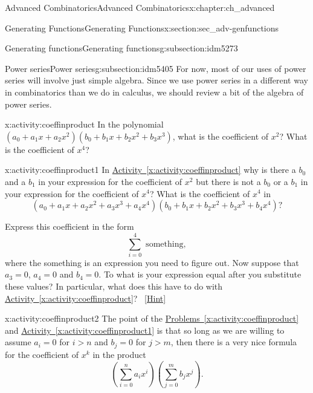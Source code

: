 \documentclass[oneside,10pt,]{book}
\numberwithin{equation}{chapter}
\begin{document}
\begin{chapterptx}{Advanced Combinatorics}{}{Advanced Combinatorics}{}{}{x:chapter:ch_advanced}
\begin{sectionptx}{Generating Functions}{}{Generating Functions}{}{}{x:section:sec_adv-genfunctions}
\begin{subsectionptx}{Generating functions}{}{Generating functions}{}{}{g:subsection:idm5273}
\end{subsectionptx}
%
%
\typeout{************************************************}
\typeout{************************************************}
%
\begin{subsectionptx}{Power series}{}{Power series}{}{}{g:subsection:idm5405}
For now, most of our uses of power series will involve just simple algebra. Since we use power series in a different way in combinatorics than we do in calculus, we should review a bit of the algebra of power series.%
\begin{activity}{}{x:activity:coeffinproduct}%
In the polynomial \((a_0 +a_1x+a_2x^2)(b_0+b_1x+b_2x^2+b_3x^3)\), what is the coefficient of \(x^2\)? What is the coefficient of \(x^4\)?%
\end{activity}
\begin{activity}{}{x:activity:coeffinproduct1}%
In \hyperref[x:activity:coeffinproduct]{Activity~\ref{x:activity:coeffinproduct}} why is there a \(b_0\) and a \(b_1\) in your expression for the coefficient of \(x^2\) but there is not a \(b_0\) or a \(b_1\) in your expression for the coefficient of \(x^4\)? What is the coefficient of \(x^4\) in%
\begin{equation*}
(a_0+a_1x+a_2x^2+a_3x^3+a_4x^4)(b_0+b_1x+b_2x^2
+b_3x^3+b_4x^4)?
\end{equation*}
%
\par
Express this coefficient in the form%
\begin{equation*}
\sum_{i=0}^4 \mbox{ something} ,
\end{equation*}
where the something is an expression you need to figure out. Now suppose that \(a_3=0\), \(a_4=0\) and \(b_4=0\). To what is your expression equal after you substitute these values? In particular, what does this have to do with \hyperref[x:activity:coeffinproduct]{Activity~\ref{x:activity:coeffinproduct}}?%
\qquad~\hfill{\tiny\hyperlink{g:hint:idm5438-back}{[Hint]}}\end{activity}
\begin{activity}{}{x:activity:coeffinproduct2}%
The point of the \hyperref[x:activity:coeffinproduct]{Problems~\ref{x:activity:coeffinproduct}} and \hyperref[x:activity:coeffinproduct1]{Activity~\ref{x:activity:coeffinproduct1}} is that so long as we are willing to assume \(a_i=0\) for \(i>n\) and \(b_j =0\) for \(j>m\), then there is a very nice formula for the coefficient of \(x^k\) in the product%
\begin{equation*}
\left(\sum_{i=0}^n a_ix^i\right)\left(\sum_{j=0}^m b_jx^j\right).

\end{equation*}
\end{activity}
\end{subsectionptx}
\end{sectionptx}
\end{chapterptx}
\end{document}
